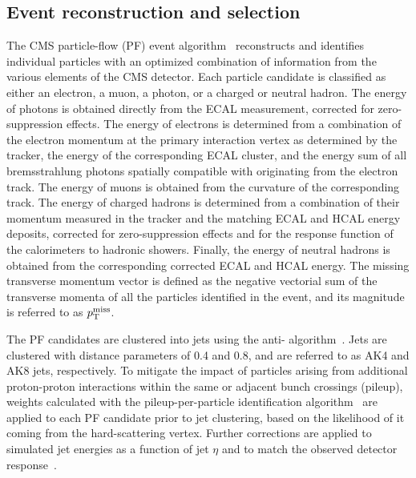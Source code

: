 \documentclass[11pt,twoside,a4paper,cmspaper,final,collab]{cms-tdr}
\begin{document}
\subsection{Event reconstruction and selection}

The CMS particle-flow (PF) event
algorithm~\cite{Sirunyan:2017ulk} reconstructs and identifies
individual particles with an optimized combination of information from
the various elements of the CMS detector. 
Each particle candidate is classified as either an electron, a muon, a photon, or a charged or neutral hadron.
The energy of photons is obtained directly from the ECAL measurement, 
corrected for zero-suppression effects.
The energy of electrons is determined from a combination of the electron momentum at the primary interaction vertex
as determined by the tracker, the energy of the corresponding ECAL cluster, and the energy sum of all bremsstrahlung photons spatially
compatible with originating from the electron track. 
The energy of muons is obtained from the curvature of the corresponding track. 
The energy of charged hadrons is determined from a combination of their
momentum measured in the tracker and the matching ECAL and HCAL energy
deposits, corrected for zero-suppression effects and for the response
function of the calorimeters to hadronic showers. 
Finally, the energy of neutral hadrons is obtained from the corresponding corrected ECAL
and HCAL energy. The missing transverse momentum vector is defined as 
the negative vectorial sum of the transverse momenta of all the particles identified in the event, 
and its magnitude is referred to as $p_{\mathrm{T}}^{\mathrm{miss}}$.

The PF candidates are clustered into jets using the anti-\kt
algorithm~\cite{Cacciari:2008gp,Cacciari:2011ma}.
Jets are clustered with distance parameters of 0.4 and 0.8, and are referred to as AK4 and AK8 jets, respectively.
To mitigate the impact of particles arising from additional proton-proton interactions 
within the same or adjacent bunch crossings (pileup),
weights calculated with the pileup-per-particle identification 
algorithm~\cite{Bertolini:2014bba} are applied to each PF
candidate prior to jet clustering, based on the likelihood of it coming
from the hard-scattering vertex. 
Further corrections are applied to simulated jet energies 
as a function of jet $\eta$ and \pt to match 
the observed detector response~\cite{jec,Khachatryan:2016kdb}.
\end{document}
